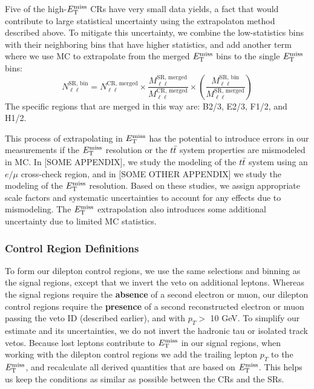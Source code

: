 Five of the high-$E_\text{T}^\text{miss}$ CRs have very small data yields, a fact that
would contribute to large statistical uncertainty using the
extrapolaton method described above. To mitigate this uncertainty, we
combine the low-statistics bins with their neighboring bins that have
higher statistics, and add another term where we use MC to extrapolate
from the merged $E_\text{T}^\text{miss}$ bins to the single $E_\text{T}^\text{miss}$ bins:
\begin{equation}
\label{eq:stop:lostlep:metextrap}
N_{\ell\ell}^\text{SR, bin} = N_{\ell\ell}^\text{CR, merged} \times \frac{M_{\ell\ell}^\text{SR, merged}}{M_{\ell\ell}^\text{CR, merged}}
\times \left( \frac{M_{\ell\ell}^\text{SR, bin}}{M_{\ell\ell}^\text{SR, merged}} \right)
\end{equation}
The specific regions that are merged in this way are: B2/3, E2/3,
F1/2, and H1/2.

This process of extrapolating in $E_\text{T}^\text{miss}$ has the potential to introduce
errors in our measurements if the $E_\text{T}^\text{miss}$ resolution or the $t\bar{t}$
system properties are mismodeled in MC. In [SOME APPENDIX], we study %
the modeling of the $t\bar{t}$ system using an $e/\mu$ cross-check
region, and in [SOME OTHER APPENDIX] we study the modeling of the %
$E_\text{T}^\text{miss}$ resolution. Based on these studies, we assign appropriate scale
factors and systematic uncertainties to account for any effects due to
mismodeling. The $E_\text{T}^\text{miss}$ extrapolation also introduces some additional
uncertainty due to limited MC statistics.

\subsubsection{Control Region Definitions}
\label{sssec:stop:lostlep:crdefinitions}

To form our dilepton control regions, we use the same selections and
binning as the signal regions, except that we invert the veto on
additional leptons. Whereas the signal regions require the \textbf{absence} of
a second electron or muon, our dilepton control regions require the
\textbf{presence} of a second reconstructed electron or muon passing the
veto ID (described earlier), and with $p_T >$ 10 GeV. To simplify
our estimate and its uncertainties, we do not invert the
hadronic tau or isolated track vetos. Because lost leptons contribute
to $E_\text{T}^\text{miss}$ in our signal regions, when working with the dilepton
control regions we add the trailing lepton $p_T$ to the $E_\text{T}^\text{miss}$, and
recalculate all derived quantities that are based on $E_\text{T}^\text{miss}$. This
helps us keep the conditions as similar as possible between the CRs
and the SRs.

